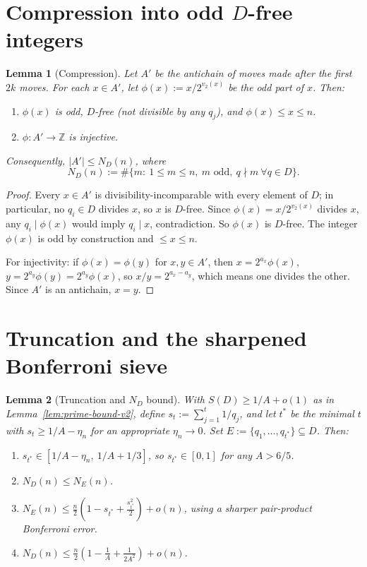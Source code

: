 \documentclass{article}
\newtheorem{lemma}{Lemma}
\begin{document}
\section{Compression into odd $D$-free integers}

\begin{lemma}[Compression]
\label{lem:compression-v2}
Let $A'$ be the antichain of moves made after the first $2k$ moves. For each $x \in A'$, let $\phi(x) := x / 2^{v_2(x)}$ be the odd part of $x$. Then:
\begin{enumerate}
  \item $\phi(x)$ is odd, $D$-free (not divisible by any $q_j$), and $\phi(x) \le x \le n$.
  \item $\phi : A' \to \mathbb{Z}$ is injective.
\end{enumerate}
Consequently, $|A'| \le N_D(n)$, where
\[
N_D(n) := \#\{m :\ 1 \le m \le n,\ m \text{ odd},\ q \nmid m\ \forall q \in D\}.
\]
\end{lemma}

\begin{proof}
Every $x \in A'$ is divisibility-incomparable with every element of $D$; in particular, no $q_i \in D$ divides $x$, so $x$ is $D$-free. Since $\phi(x) = x / 2^{v_2(x)}$ divides $x$, any $q_i \mid \phi(x)$ would imply $q_i \mid x$, contradiction. So $\phi(x)$ is $D$-free. The integer $\phi(x)$ is odd by construction and $\le x \le n$.

For injectivity: if $\phi(x) = \phi(y)$ for $x, y \in A'$, then $x = 2^{a_x} \phi(x)$, $y = 2^{a_y} \phi(y) = 2^{a_y} \phi(x)$, so $x / y = 2^{a_x - a_y}$, which means one divides the other. Since $A'$ is an antichain, $x = y$.
\end{proof}

\section{Truncation and the sharpened Bonferroni sieve}

\begin{lemma}[Truncation and $N_D$ bound]
\label{lem:truncation-v2}
With $S(D) \ge 1/A + o(1)$ as in Lemma~\ref{lem:prime-bound-v2}, define $s_t := \sum_{j=1}^{t} 1/q_j$, and let $t^*$ be the minimal $t$ with $s_t \ge 1/A - \eta_n$ for an appropriate $\eta_n \to 0$. Set $E := \{q_1, \ldots, q_{t^*}\} \subseteq D$. Then:
\begin{enumerate}
  \item $s_{t^*} \in [1/A - \eta_n,\ 1/A + 1/3]$, so $s_{t^*} \in [0, 1]$ for any $A > 6/5$.
  \item $N_D(n) \le N_E(n)$.
  \item $N_E(n) \le \frac{n}{2}\left(1 - s_{t^*} + \frac{s_{t^*}^2}{2}\right) + o(n)$, using a sharper pair-product Bonferroni error.
  \item $N_D(n) \le \frac{n}{2}\left(1 - \frac{1}{A} + \frac{1}{2 A^2}\right) + o(n)$.
\end{enumerate}
\end{lemma}
\end{document}
